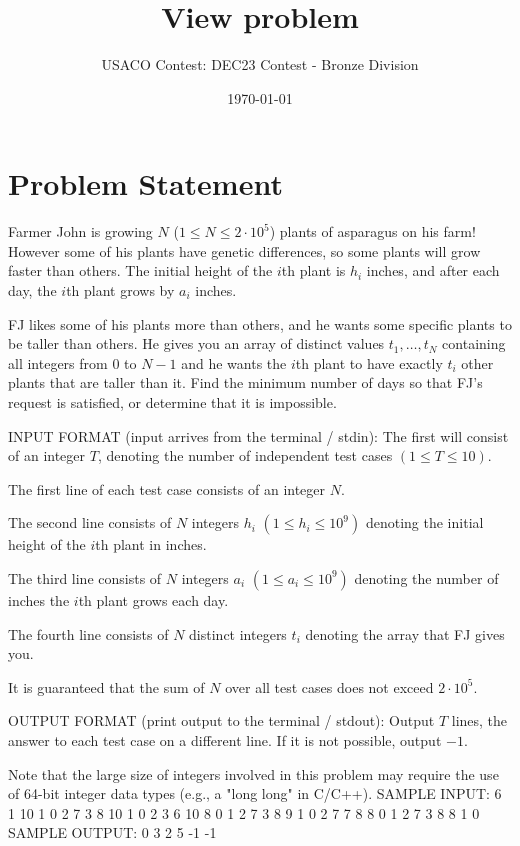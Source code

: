 \documentclass[12pt]{article}
\title{View problem}
\author{USACO Contest: DEC23 Contest - Bronze Division}
\date{\today}
\begin{document}
\maketitle

\section*{Problem Statement}


Farmer John is growing $N$ ($1 \leq N \leq 2\cdot 10^5$) plants of asparagus on
his farm! However some of his plants have genetic differences, so some plants
will grow faster than others. The initial height of the $i$th plant is $h_i$
inches, and after each day, the $i$th plant grows by $a_i$ inches. 

FJ likes some of his plants more than others, and he wants some specific plants
to be taller than others. He gives you an array of distinct values
$t_1,\dots,t_N$ containing all integers from $0$ to $N-1$ and he wants the $i$th
plant to have exactly $t_i$ other plants that are taller than it. Find the
minimum number of days so that FJ's request is satisfied, or determine that it
is impossible.

INPUT FORMAT (input arrives from the terminal / stdin):
The first will consist of an integer $T$, denoting the number of independent
test cases $(1 \leq T \leq 10)$.

The first line of each test case consists of an integer $N$.

The second line consists of $N$ integers $h_i$ $(1 \leq h_i \leq 10^9)$ denoting
the initial height of the $i$th plant in inches.

The third line consists of $N$ integers $a_i$ $(1 \leq a_i \leq 10^9)$ denoting
the number of inches the $i$th plant grows each day.

The fourth line consists of $N$ distinct integers $t_i$ denoting the array that
FJ gives you.

It is guaranteed that the sum of $N$ over all test cases does not exceed
$2\cdot 10^5$.

OUTPUT FORMAT (print output to the terminal / stdout):
Output $T$ lines, the answer to each test case on a different line. If it is not
possible, output $-1$.

Note that the large size of integers involved in this problem may require the
use of 64-bit integer data types (e.g., a "long long" in C/C++).
SAMPLE INPUT:
6
1
10
1
0
2
7 3
8 10
1 0
2
3 6
10 8
0 1
2
7 3
8 9
1 0
2
7 7
8 8
0 1
2
7 3
8 8
1 0
SAMPLE OUTPUT: 
0
3
2
5
-1
-1
\end{document}
